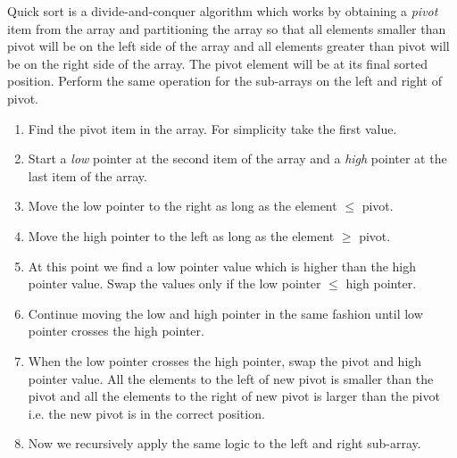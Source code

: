 \documentclass[a4paper,11pt]{book}
\begin{document}
\noindent Quick sort is a divide-and-conquer algorithm which works by obtaining a \textit{pivot} item from the array and partitioning the array so that all elements smaller than pivot will be on the left side of the array and all elements greater than pivot will be on the right side of the array. The pivot element will be at its final sorted position. Perform the same operation for the sub-arrays on the left and right of pivot.
\begin{enumerate}
    \item Find the pivot item in the array. For simplicity take the first value.
    \item Start a \textit{low} pointer at the second item of the array and a \textit{high} pointer at the last item of the array.
    \item Move the low pointer to the right as long as the element $\leq$ pivot.
    \item Move the high pointer to the left as long as the element $\geq$ pivot.
    \item At this point we find a low pointer value which is higher than the high pointer value. Swap the values only if the low pointer $\leq$ high pointer.
    \item Continue moving the low and high pointer in the same fashion until low pointer crosses the high pointer.
    \item When the low pointer crosses the high pointer, swap the pivot and high pointer value. All the elements to the left of new pivot is smaller than the pivot and all the elements to the right of new pivot is larger than the pivot i.e. the new pivot is in the correct position.
    \item Now we recursively apply the same logic to the left and right sub-array.
\end{enumerate}
\end{document}
